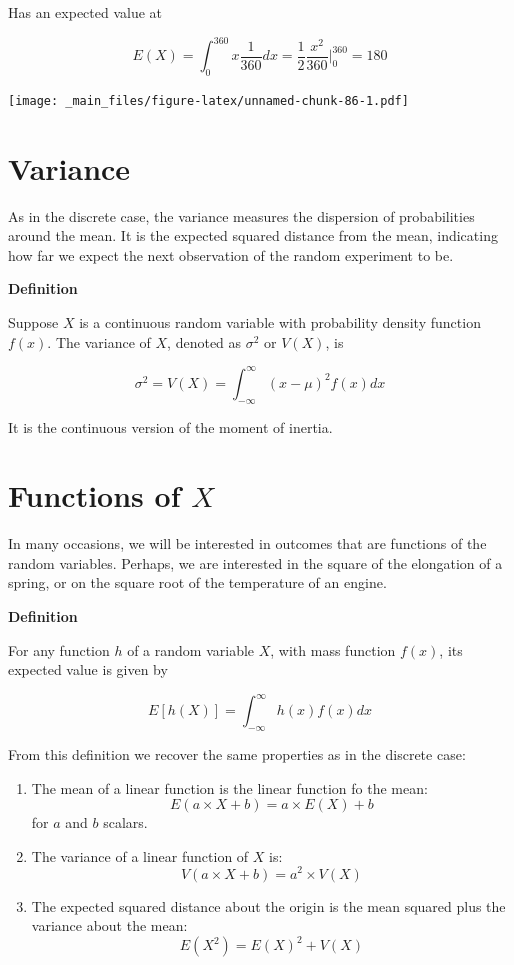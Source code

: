 \documentclass[
]{book}
\begin{document}
Has an expected value at

\[E(X)=\int_{0}^{360} x\frac{1}{360}dx= \frac{1}{2}\frac{x^2}{360} |_0^{360}= 180\]

\texttt{[image: \_main\_files/figure-latex/unnamed-chunk-86-1.pdf]}

\hypertarget{variance-1}{%
\section{Variance}\label{variance-1}}

As in the discrete case, the variance measures the dispersion of probabilities around the mean. It is the expected squared distance from the mean, indicating how far we expect the next observation of the random experiment to be.

\textbf{Definition}

Suppose \(X\) is a continuous random variable with probability density function \(f(x)\). The variance of \(X\), denoted as \(\sigma^2\) or \(V(X)\), is

\[\sigma^2=V(X)=\int_{-\infty}^\infty (x-\mu)^2 f(x) dx\]

It is the continuous version of the moment of inertia.

\hypertarget{functions-of-x}{%
\section{\texorpdfstring{Functions of \(X\)}{Functions of X}}\label{functions-of-x}}

In many occasions, we will be interested in outcomes that are functions of the random variables. Perhaps, we are interested in the square of the elongation of a spring, or on the square root of the temperature of an engine.

\textbf{Definition}

For any function \(h\) of a random variable \(X\), with mass function \(f(x)\), its expected value is given by

\[E[h(X)]= \int_{-\infty}^{\infty} h(x) f(x)dx\]

From this definition we recover the same properties as in the discrete case:

\begin{enumerate}
\def\labelenumi{\arabic{enumi})}
\item
  The mean of a linear function is the linear function fo the mean: \[E(a\times X +b)= a\times E(X) +b\] for \(a\) and \(b\) scalars.
\item
  The variance of a linear function of \(X\) is:\[V(a\times X +b)= a^2\times V(X)\]
\item
  The expected squared distance about the origin is the mean squared plus the variance about the mean: \[E(X^2)=E(X)^2+V(X)\]
\end{enumerate}
\end{document}

